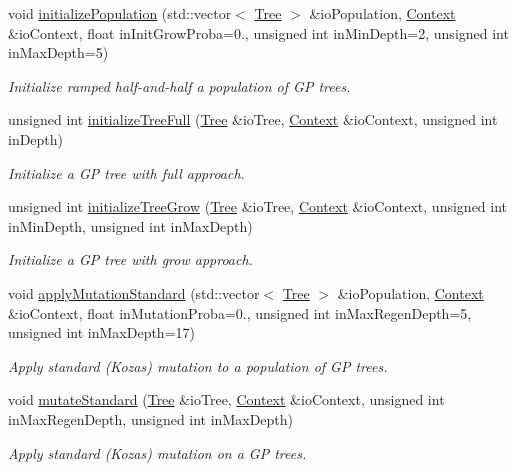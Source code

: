 \begin{DoxyCompactItemize}
void \hyperlink{group__Puppy_ga965ce68758651c3b9cf03db03799f709}{initialize\+Population} (std\+::vector$<$ \hyperlink{classPuppy_1_1Tree}{Tree} $>$ \&io\+Population, \hyperlink{classPuppy_1_1Context}{Context} \&io\+Context, float in\+Init\+Grow\+Proba=0., unsigned int in\+Min\+Depth=2, unsigned int in\+Max\+Depth=5)
\begin{DoxyCompactList}\small\item\em Initialize ramped half-\/and-\/half a population of G\+P trees. \end{DoxyCompactList}\item 
unsigned int \hyperlink{group__Puppy_ga0039778b0dbe47bcf5889d6587f75536}{initialize\+Tree\+Full} (\hyperlink{classPuppy_1_1Tree}{Tree} \&io\+Tree, \hyperlink{classPuppy_1_1Context}{Context} \&io\+Context, unsigned int in\+Depth)
\begin{DoxyCompactList}\small\item\em Initialize a G\+P tree with full approach. \end{DoxyCompactList}\item 
unsigned int \hyperlink{group__Puppy_gac4bc47167b30efa18c41f039b00d4b66}{initialize\+Tree\+Grow} (\hyperlink{classPuppy_1_1Tree}{Tree} \&io\+Tree, \hyperlink{classPuppy_1_1Context}{Context} \&io\+Context, unsigned int in\+Min\+Depth, unsigned int in\+Max\+Depth)
\begin{DoxyCompactList}\small\item\em Initialize a G\+P tree with grow approach. \end{DoxyCompactList}\item 
void \hyperlink{group__Puppy_gae96197fb941007acd222f578815270ff}{apply\+Mutation\+Standard} (std\+::vector$<$ \hyperlink{classPuppy_1_1Tree}{Tree} $>$ \&io\+Population, \hyperlink{classPuppy_1_1Context}{Context} \&io\+Context, float in\+Mutation\+Proba=0., unsigned int in\+Max\+Regen\+Depth=5, unsigned int in\+Max\+Depth=17)
\begin{DoxyCompactList}\small\item\em Apply standard (Koza\textquotesingle{}s) mutation to a population of G\+P trees. \end{DoxyCompactList}\item 
void \hyperlink{group__Puppy_ga169b89be413e3893bb96392b8c06fca9}{mutate\+Standard} (\hyperlink{classPuppy_1_1Tree}{Tree} \&io\+Tree, \hyperlink{classPuppy_1_1Context}{Context} \&io\+Context, unsigned int in\+Max\+Regen\+Depth, unsigned int in\+Max\+Depth)
\begin{DoxyCompactList}\small\item\em Apply standard (Koza\textquotesingle{}s) mutation on a G\+P trees. \end{DoxyCompactList}\item 

\end{DoxyCompactItemize}
